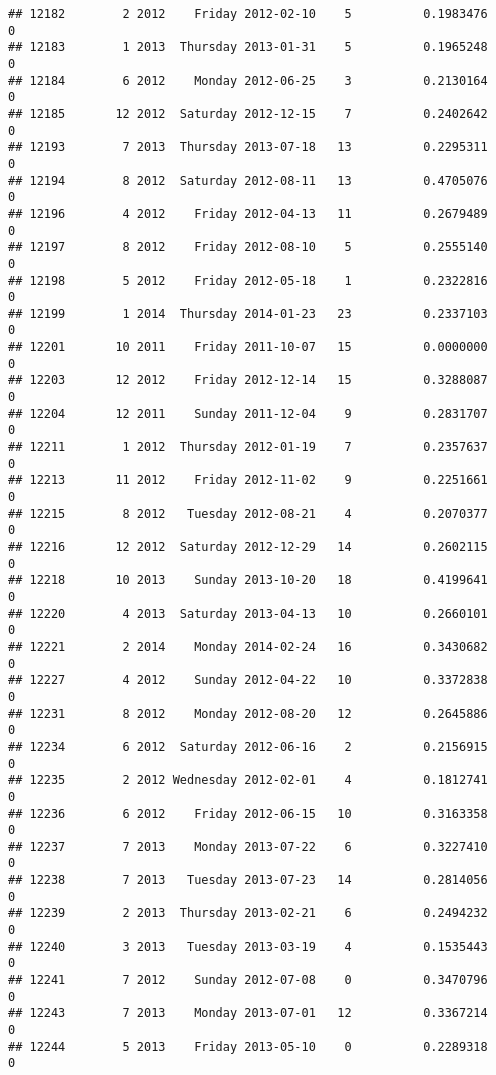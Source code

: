 \documentclass[
]{article}
\begin{document}
\begin{verbatim}
## 12182        2 2012    Friday 2012-02-10    5          0.1983476             0
## 12183        1 2013  Thursday 2013-01-31    5          0.1965248             0
## 12184        6 2012    Monday 2012-06-25    3          0.2130164             0
## 12185       12 2012  Saturday 2012-12-15    7          0.2402642             0
## 12193        7 2013  Thursday 2013-07-18   13          0.2295311             0
## 12194        8 2012  Saturday 2012-08-11   13          0.4705076             0
## 12196        4 2012    Friday 2012-04-13   11          0.2679489             0
## 12197        8 2012    Friday 2012-08-10    5          0.2555140             0
## 12198        5 2012    Friday 2012-05-18    1          0.2322816             0
## 12199        1 2014  Thursday 2014-01-23   23          0.2337103             0
## 12201       10 2011    Friday 2011-10-07   15          0.0000000             0
## 12203       12 2012    Friday 2012-12-14   15          0.3288087             0
## 12204       12 2011    Sunday 2011-12-04    9          0.2831707             0
## 12211        1 2012  Thursday 2012-01-19    7          0.2357637             0
## 12213       11 2012    Friday 2012-11-02    9          0.2251661             0
## 12215        8 2012   Tuesday 2012-08-21    4          0.2070377             0
## 12216       12 2012  Saturday 2012-12-29   14          0.2602115             0
## 12218       10 2013    Sunday 2013-10-20   18          0.4199641             0
## 12220        4 2013  Saturday 2013-04-13   10          0.2660101             0
## 12221        2 2014    Monday 2014-02-24   16          0.3430682             0
## 12227        4 2012    Sunday 2012-04-22   10          0.3372838             0
## 12231        8 2012    Monday 2012-08-20   12          0.2645886             0
## 12234        6 2012  Saturday 2012-06-16    2          0.2156915             0
## 12235        2 2012 Wednesday 2012-02-01    4          0.1812741             0
## 12236        6 2012    Friday 2012-06-15   10          0.3163358             0
## 12237        7 2013    Monday 2013-07-22    6          0.3227410             0
## 12238        7 2013   Tuesday 2013-07-23   14          0.2814056             0
## 12239        2 2013  Thursday 2013-02-21    6          0.2494232             0
## 12240        3 2013   Tuesday 2013-03-19    4          0.1535443             0
## 12241        7 2012    Sunday 2012-07-08    0          0.3470796             0
## 12243        7 2013    Monday 2013-07-01   12          0.3367214             0
## 12244        5 2013    Friday 2013-05-10    0          0.2289318             0

\end{verbatim}
\end{document}
